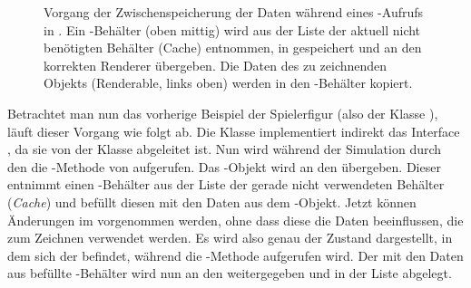 \begin{figure}
	\centering
		\caption[Vorgang der Zwischenspeicherung der Daten während eines -Aufrufs in .]{Vorgang der Zwischenspeicherung der Daten während eines -Aufrufs in . Ein -Behälter (oben mittig) wird aus der Liste der aktuell nicht benötigten Behälter (Cache) entnommen, in  gespeichert und an den korrekten Renderer übergeben. Die Daten des zu zeichnenden Objekts (Renderable, links oben) werden in den -Behälter kopiert.}\label{fig:copyRenderable}
\end{figure}


\begin{example}
	Betrachtet man nun das vorherige Beispiel der Spielerfigur (also der Klasse ), läuft dieser Vorgang wie folgt ab. Die Klasse  implementiert indirekt das Interface , da sie von der Klasse  abgeleitet ist. Nun wird während der Simulation durch den  die -Methode von  aufgerufen. Das -Objekt wird an den  übergeben. Dieser entnimmt einen -Behälter aus der Liste der gerade nicht verwendeten Behälter (\emph{Cache}) und befüllt diesen mit den Daten aus dem -Objekt. Jetzt können Änderungen im  vorgenommen werden, ohne dass diese die Daten beeinflussen, die zum Zeichnen verwendet werden. Es wird also genau der Zustand dargestellt, in dem sich der  befindet, während die -Methode aufgerufen wird. Der mit den Daten aus  befüllte -Behälter wird nun an den  weitergegeben und in der Liste  abgelegt.
\end{example}

